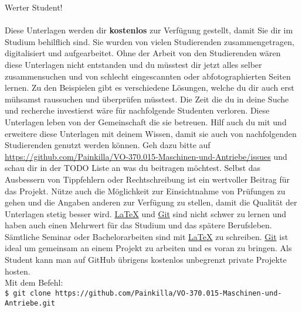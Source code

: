 \documentclass[12pt]{article} %
\numberwithin{equation}{subsection}
\begin{document}
	
	\tableofcontents %
	
	\newpage %
	Werter Student!\\
	\\
	Diese Unterlagen werden dir \textbf{kostenlos} zur Verfügung gestellt, damit Sie dir im Studium behilflich sind. Sie wurden von vielen Studierenden zusammengetragen, digitalisiert und aufgearbeitet. Ohne der Arbeit von den Studierenden wären diese Unterlagen nicht entstanden und du müsstest dir jetzt alles selber zusammensuchen und von schlecht eingescannten oder abfotographierten Seiten lernen. Zu den Beispielen gibt es verschiedene Lösungen, welche du dir auch erst mühsamst raussuchen und überprüfen müsstest. Die Zeit die du in deine Suche und recherche investierst wäre für nachfolgende Studenten verloren. Diese Unterlagen leben von der Gemeinschaft die sie betreuen. Hilf auch du mit und erweitere diese Unterlagen mit deinem Wissen, damit sie auch von nachfolgenden Studierenden genutzt werden können. Geh dazu bitte auf \href{https://github.com/Painkilla/VO-370.015-Maschinen-und-Antriebe/issues}{https://github.com/Painkilla/VO-370.015-Maschinen-und-Antriebe/issues} und schau dir in der TODO Liste an was du beitragen möchtest. Selbst das Ausbessern von Tippfehlern oder Rechtschreibung ist ein wertvoller Beitrag für das Projekt. Nütze auch die Möglichkeit zur Einsichtnahme von Prüfungen zu gehen und die Angaben anderen zur Verfügung zu stellen, damit die Qualität der Unterlagen stetig besser wird. \href{https://www.latex-project.org/get/}{\LaTeX} und \href{https://git-scm.com/downloads}{Git} sind nicht schwer zu lernen und haben auch einen Mehrwert für das Studium und das spätere Berufsleben. Sämtliche Seminar oder Bachelorarbeiten sind mit \href{https://www.latex-project.org/get/}{\LaTeX} zu schreiben. \href{https://git-scm.com/downloads}{Git} ist ideal um gemeinsam an einem Projekt zu arbeiten und es voran zu bringen. Als Student kann man auf GitHub übrigens kostenlos unbegrenzt private Projekte hosten.\\
	Mit dem Befehl:\\
	\texttt{\$ git clone https://github.com/Painkilla/VO-370.015-Maschinen-und-Antriebe.git}\\
\end{document}

